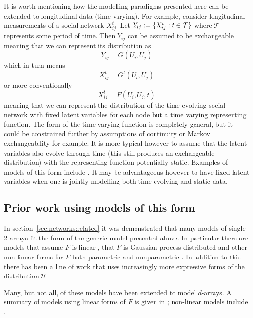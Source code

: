It is worth mentioning how the modelling paradigms presented here can be extended to longitudinal data (\ie time varying).
For example, consider longitudinal measurements of a social network $X_{ij}^t$.
Let $Y_{ij} := \{X_{ij}^t : t \in \mathcal{T}\}$ where $\mathcal{T}$ represents some period of time.
Then $Y_{ij}$ can be assumed to be exchangeable meaning that we can represent its distribution as
\[
  Y_{ij} = G(U_i, U_j)
\]
which in turn means
\[
  X_{ij}^t = G^t(U_i, U_j)
\]
or more conventionally
\[
  X_{ij}^t = F(U_i, U_j, t)
\]
meaning that we can represent the distribution of the time evolving social network with fixed latent variables for each node but a time varying representing function.
The form of the time varying function is completely general, but it could be constrained further by assumptions of continuity or Markov exchangeability for example.
It is more typical however to assume that the latent variables also evolve through time (this still produces an exchangeable distribution) with the representing function potentially static.
Examples of models of this form include \citep[e.g.][]{Adams2010-ln, durante2014bayesian}.
It may be advantageous however to have fixed latent variables when one is jointly modelling both time evolving and static data.

\subsection{Prior work using models of this form}

In section~\ref{sec:networks:related} it was demonstrated that many models of single 2-arrays fit the form of the generic model presented above.
In particular there are models that assume $F$ is linear \citep[e.g.][]{Hoff2007-ja, Meeds2007-gd, Salakhutdinov2008-zt, Yu2008-tz, Miller2009-wg}, that $F$ is Gaussian process distributed \citep[e.g.][]{Lawrence2009-za, Yan2011-lc, Lloyd2012-sb} and other non-linear forms for $F$ both parametric \citep[e.g.][]{Hoff2002-vy} and nonparametric \citep[e.g.][]{Roy2009-ge}.
In addition to this there has been a line of work that uses increasingly more expressive forms of the distribution $\mathcal{U}$ \citep[e.g.][]{Wang1987-jd, Hoffman_undated-ri, Nowicki2001-xm, Kemp2006-jt, Xu2006-uy, Meeds2007-gd, Miller2009-wg, Palla2012-ch}.

Many, but not all, of these models have been extended to model $d$-arrays.
A summary of models using linear forms of $F$ is given in \cite{Kolda2009-ba}; non-linear models include \cite{Xu2012-ub}.

